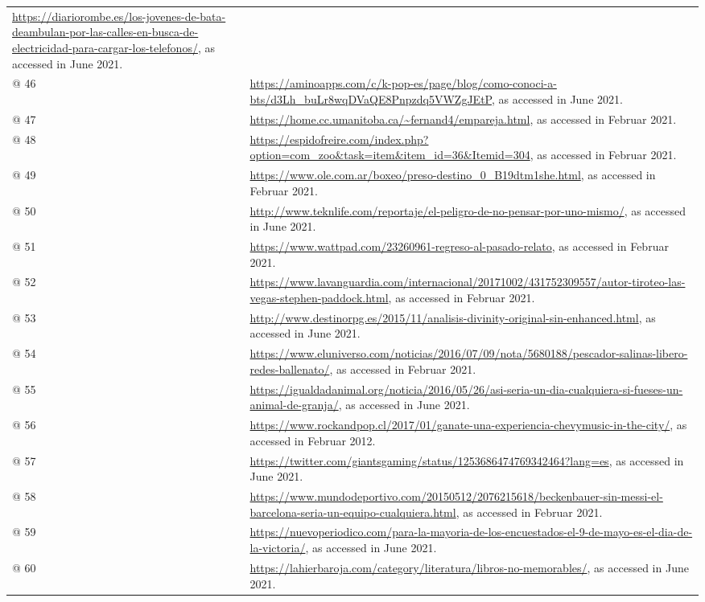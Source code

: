 \documentclass[10pt]{article}
\begin{document}
\begin{flushleft}
\begin{supertabular}{m{0.7955598in}m{5.35876in}}
\url{https://diariorombe.es/los-jovenes-de-bata-deambulan-por-las-calles-en-busca-de-electricidad-para-cargar-los-telefonos/}, as accessed in June 2021.\\
@ 46  &
\url{https://aminoapps.com/c/k-pop-es/page/blog/como-conoci-a-bts/d3Lh_buLr8wqDVaQE8Pnpzdq5VWZgJEtP}, as accessed in June 2021.\\
@ 47  &
\url{https://home.cc.umanitoba.ca/~fernand4/empareja.html}, as accessed in Februar 2021.\\
@ 48  &
\url{https://espidofreire.com/index.php?option=com_zoo&task=item&item_id=36&Itemid=304}, as accessed in Februar 2021.\\
@ 49  &
\url{https://www.ole.com.ar/boxeo/preso-destino_0_B19dtm1she.html}, as accessed in Februar 2021.\\
@ 50  &
\url{http://www.teknlife.com/reportaje/el-peligro-de-no-pensar-por-uno-mismo/}, as accessed in June 2021.\\
@ 51  &
\url{https://www.wattpad.com/23260961-regreso-al-pasado-relato}, as accessed in Februar 2021.\\
@ 52  &
\url{https://www.lavanguardia.com/internacional/20171002/431752309557/autor-tiroteo-las-vegas-stephen-paddock.html}, as accessed in Februar 2021.\\
@ 53  &
\url{http://www.destinorpg.es/2015/11/analisis-divinity-original-sin-enhanced.html}, as accessed in June 2021.\\
@ 54  &
\url{https://www.eluniverso.com/noticias/2016/07/09/nota/5680188/pescador-salinas-libero-redes-ballenato/}, as accessed in Februar 2021.\\
@ 55  &
\url{https://igualdadanimal.org/noticia/2016/05/26/asi-seria-un-dia-cualquiera-si-fueses-un-animal-de-granja/}, as accessed in June 2021.\\
@ 56  &
\url{https://www.rockandpop.cl/2017/01/ganate-una-experiencia-chevymusic-in-the-city/}, as accessed in Februar 2012.\\
@ 57  &
\url{https://twitter.com/giantsgaming/status/1253686474769342464?lang=es}, as accessed in June 2021.\\
@ 58  &
\url{https://www.mundodeportivo.com/20150512/2076215618/beckenbauer-sin-messi-el-barcelona-seria-un-equipo-cualquiera.html}, as accessed in Februar 2021.\\
@ 59  &
\url{https://nuevoperiodico.com/para-la-mayoria-de-los-encuestados-el-9-de-mayo-es-el-dia-de-la-victoria/}, as accessed in June 2021.\\
@ 60  &
\url{https://lahierbaroja.com/category/literatura/libros-no-memorables/}, as accessed in June 2021.\\

\end{supertabular}
\end{flushleft}
\end{document}
